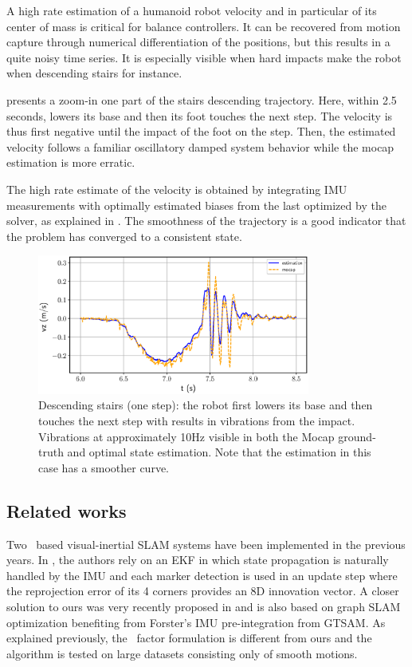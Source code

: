 A high rate estimation of a humanoid robot velocity and in particular of its center of mass is critical for balance controllers. It can be recovered from motion capture through numerical differentiation of the positions, but this results in a quite noisy time series. It is especially visible when hard impacts make the robot when descending stairs for instance.

 presents a zoom-in one part of the stairs descending trajectory. Here, within 2.5 seconds,  lowers its base and then its foot touches the next step. The velocity is thus first negative until the impact of the foot on the step. Then, the estimated velocity follows a familiar oscillatory damped system behavior while the mocap estimation is more erratic. 

The high rate estimate of the velocity is obtained by integrating IMU measurements with optimally estimated biases from the last \keyframe optimized by the solver, as explained in . The smoothness of the trajectory is a good indicator that the problem has converged to a consistent state.


\begin{figure}[h]
    \centering
    \includegraphics[width=0.8\textwidth]{figures/absolute/vz_descending_onestep.eps}
    \caption{Descending stairs (one step): the robot first lowers its base and then touches the next step with results in vibrations from the impact.
    Vibrations at approximately 10Hz visible in both the Mocap ground-truth and optimal state estimation. Note that the estimation in this case has a smoother curve.}
    \label{fig:vz_descending_onestep}
\end{figure}

\subsection{Related works}
Two \apriltag\ based visual-inertial SLAM systems have been implemented in the previous years. 
In \cite{neunert2016open}, the authors rely on an EKF in which state propagation is naturally 
handled by the IMU and each marker detection is used in an update step where the reprojection error of its 4 corners provides an 8D innovation vector. 
A closer solution to ours was very recently proposed in \cite{he2019lightweight} and is also based on graph SLAM optimization benefiting from 
Forster's IMU pre-integration from GTSAM. As explained previously, the \apriltag\  factor formulation is different from ours and the algorithm is tested 
on large datasets consisting only of smooth motions.
